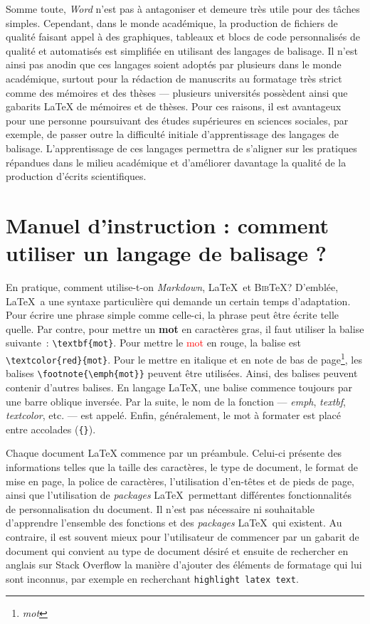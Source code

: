 \documentclass[
  letterpaper,
  DIV=11,
  numbers=noendperiod,
  oneside]{scrreprt}
\begin{document}
Somme toute, \emph{Word} n'est pas à antagoniser et demeure très utile
pour des tâches simples. Cependant, dans le monde académique, la
production de fichiers de qualité faisant appel à des graphiques,
tableaux et blocs de code personnalisés de qualité et automatisés est
simplifiée en utilisant des langages de balisage. Il n'est ainsi pas
anodin que ces langages soient adoptés par plusieurs dans le monde
académique, surtout pour la rédaction de manuscrits au formatage très
strict comme des mémoires et des thèses --- plusieurs universités
possèdent ainsi que gabarits \LaTeX{} de mémoires et de thèses. Pour ces
raisons, il est avantageux pour une personne poursuivant des études
supérieures en sciences sociales, par exemple, de passer outre la
difficulté initiale d'apprentissage des langages de balisage.
L'apprentissage de ces langages permettra de s'aligner sur les pratiques
répandues dans le milieu académique et d'améliorer davantage la qualité
de la production d'écrits scientifiques.

\hypertarget{manuel-dinstruction-comment-utiliser-un-langage-de-balisage}{%
\section{Manuel d'instruction : comment utiliser un langage de balisage
?}\label{manuel-dinstruction-comment-utiliser-un-langage-de-balisage}}

En pratique, comment utilise-t-on \emph{Markdown}, \LaTeX{}~et
\textsc{Bib}\TeX? D'emblée, \LaTeX{}~a une syntaxe particulière qui
demande un certain temps d'adaptation. Pour écrire une phrase simple
comme celle-ci, la phrase peut être écrite telle quelle. Par contre,
pour mettre un \textbf{mot} en caractères gras, il faut utiliser la
balise suivante~: \texttt{\textbackslash{}textbf\{mot\}}. Pour mettre le
\textcolor{red}{mot} en rouge, la balise est
\texttt{\textbackslash{}textcolor\{red\}\{mot\}}. Pour le mettre en
italique et en note de bas de page\footnote{\emph{mot}}, les balises
\texttt{\textbackslash{}footnote\{\textbackslash{}emph\{mot\}\}} peuvent
être utilisées. Ainsi, des balises peuvent contenir d'autres balises. En
langage \LaTeX{}, une balise commence toujours par une barre oblique
inversée. Par la suite, le nom de la fonction --- \emph{emph},
\emph{textbf}, \emph{textcolor}, etc. --- est appelé. Enfin,
généralement, le mot à formater est placé entre accolades
(\texttt{\{\}}).

Chaque document \LaTeX{} commence par un préambule. Celui-ci présente
des informations telles que la taille des caractères, le type de
document, le format de mise en page, la police de caractères,
l'utilisation d'en-têtes et de pieds de page, ainsi que l'utilisation de
\emph{packages} \LaTeX{}~permettant différentes fonctionnalités de
personnalisation du document. Il n'est pas nécessaire ni souhaitable
d'apprendre l'ensemble des fonctions et des \emph{packages} \LaTeX{}~qui
existent. Au contraire, il est souvent mieux pour l'utilisateur de
commencer par un gabarit de document qui convient au type de document
désiré et ensuite de rechercher en anglais sur Stack Overflow la manière
d'ajouter des éléments de formatage qui lui sont inconnus, par exemple
en recherchant \texttt{highlight\ latex\ text}.
\end{document}
